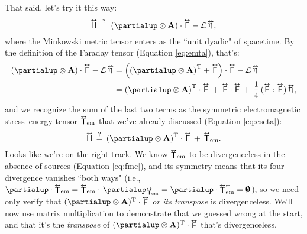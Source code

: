 \documentclass[12pt]{article}
\renewcommand{\vv}[1]{\mathbf{#1}}
\newcommand{\tightoverset}[2]{%
  \mathop{#2}\limits^{\vbox to -.5ex{\kern-0.75ex\hbox{$#1$}\vss}}}
\newcommand{\inlinedy}[1]{\tightoverset{\text{\tiny$\bm\leftrightarrow$}}{#1}}
\newcommand{\fnoverset}[2]{%
  \mathop{#2}\limits^{\vbox to -.5ex{\kern-0.85ex\hbox{$#1$}\vss}}}
\newcommand{\footnotedy}[1]{\fnoverset{\text{\tiny$\bm\leftrightarrow$}}{#1}}
\newcommand{\capdy}[1]{ \overset{ \text{\tiny$\bm\leftrightarrow$} }{\vphantom{\text{\small{A}}}\smash{#1}} }
\begin{document}
That said, let's try it this way:
\begin{equation*}
\capdy{\mathsf{H}} \, \stackrel{?}{=} \, \left( \partialup \otimes \vv A \right) \cdot \capdy{\mathsf{F}} - \mathcal{L} \inlinedy{\upeta} ,
\end{equation*}
where the Minkowski metric tensor enters as the ``unit dyadic" of spacetime. By the definition of the Faraday tensor (Equation \ref{eq:emta}), that's:
\begin{equation*}
\begin{split}
\left( \partialup \otimes \vv A \right) \cdot \capdy{\mathsf{F}} - \mathcal{L} \inlinedy{\upeta} &=  \left( \left( \partialup \otimes \vv A \right)^\mathrm{T} + \capdy{\mathsf{F}} \right) \cdot \capdy{\mathsf{F}} - \mathcal{L} \inlinedy{\upeta} \\
&= \left( \partialup \otimes \vv A \right)^\mathrm{T} \cdot \capdy{\mathsf{F}} \, + \, \capdy{\mathsf{F}} \cdot \capdy{\mathsf{F}} \, + \, \dfrac{1}{4} \, ( \capdy{\mathsf{F}} : \capdy{\mathsf{F}} ) \inlinedy{\upeta},
\end{split}
\end{equation*}
and we recognize the sum of the last two terms as the symmetric electromagnetic stress--energy tensor ${\inlinedy{\mathsf{T}}}_{\textrm{em}}$ that we've already discussed (Equation \ref{eq:eseta}):
\begin{equation*}
\capdy{\mathsf{H}} \, \stackrel{?}{=} \, \left( \partialup \otimes \vv A \right)^\mathrm{T} \cdot \capdy{\mathsf{F}} \, + \, \capdy{\mathsf{T}}_{\textrm{em}} .
\end{equation*}
Looks like we're on the right track. We know ${\inlinedy{\mathsf{T}}}_{\textrm{em}}$ to be divergenceless in the absence of sources (Equation \ref{eq:fmc}), and its symmetry means that its four-divergence vanishes ``both ways" (i.e., ${\partialup \cdot {\inlinedy{\mathsf{T}}}_{\textrm{em}} = {\inlinedy{\mathsf{T}}}_{\textrm{em}} \cdot \, \partialup _{{\footnotedy{\mathsf{T}}}\mkern-3mu_{\textrm{em}}} = \partialup \cdot {\inlinedy{\mathsf{T}}} {}^{\mathrm{T}}_{\textrm{em}} = \textrm{\mbox{\boldmath $\emptyset$}}}$), so we need only verify that $( \partialup \otimes \vv A )^\mathrm{T} \cdot \inlinedy{\mathsf{F}}$ \emph{or its transpose} is divergenceless. We'll now use matrix multiplication to demonstrate that we guessed wrong at the start, and that it's the \emph{transpose} of $( \partialup \otimes \vv A )^\mathrm{T} \cdot \inlinedy{\mathsf{F}}$ that's divergenceless.
\end{document}
